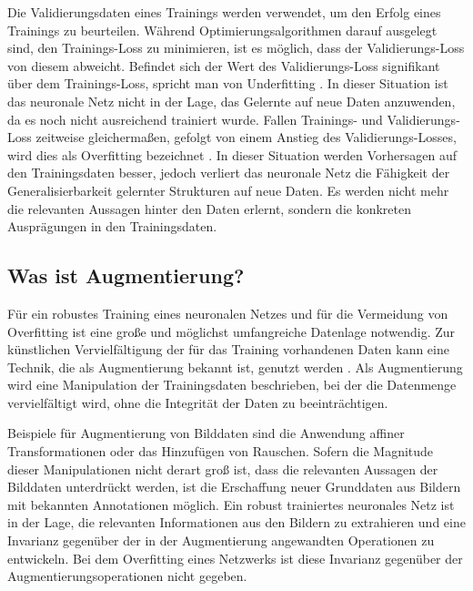 Die Validierungsdaten eines Trainings werden verwendet, um den Erfolg eines Trainings zu beurteilen. Während Optimierungsalgorithmen darauf ausgelegt sind, den Trainings-Loss zu minimieren, ist es möglich, dass der Validierungs-Loss von diesem abweicht. Befindet sich der Wert des Validierungs-Loss signifikant über dem Trainings-Loss, spricht man von Underfitting \cite{nn_terminology,cv_general}. In dieser Situation ist das neuronale Netz nicht in der Lage, das Gelernte auf neue Daten anzuwenden, da es noch nicht ausreichend trainiert wurde. Fallen Trainings- und Validierungs-Loss zeitweise gleichermaßen, gefolgt von einem Anstieg des Validierungs-Losses, wird dies als Overfitting bezeichnet \cite{cv_general}. In dieser Situation werden Vorhersagen auf den Trainingsdaten besser, jedoch verliert das neuronale Netz die Fähigkeit der Generalisierbarkeit gelernter Strukturen auf neue Daten. Es werden nicht mehr die relevanten Aussagen hinter den Daten erlernt, sondern die konkreten Ausprägungen in den Trainingsdaten.


\subsection{Was ist Augmentierung?}
\label{sec:was_augmentierung}

Für ein robustes Training eines neuronalen Netzes und für die Vermeidung von Overfitting ist eine große und möglichst umfangreiche Datenlage notwendig. Zur künstlichen Vervielfältigung der für das Training vorhandenen Daten kann eine Technik, die als Augmentierung bekannt ist, genutzt werden \cite{cv_general}. Als Augmentierung wird eine Manipulation der Trainingsdaten beschrieben, bei der die Datenmenge vervielfältigt wird, ohne die Integrität der Daten zu beeinträchtigen. 

Beispiele für Augmentierung von Bilddaten sind die Anwendung affiner Transformationen oder das Hinzufügen von Rauschen. Sofern die Magnitude dieser Manipulationen nicht derart groß ist, dass die relevanten Aussagen der Bilddaten unterdrückt werden, ist die Erschaffung neuer Grunddaten aus Bildern mit bekannten Annotationen möglich. Ein robust trainiertes neuronales Netz ist in der Lage, die relevanten Informationen aus den Bildern zu extrahieren und eine Invarianz gegenüber der in der Augmentierung angewandten Operationen zu entwickeln. Bei dem Overfitting eines Netzwerks ist diese Invarianz gegenüber der Augmentierungsoperationen nicht gegeben.

